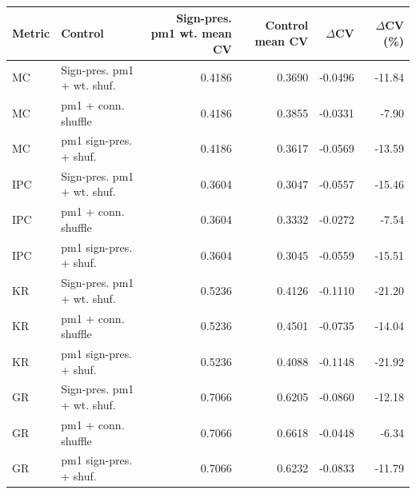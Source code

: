 \begin{tabular}{llrrrr}
\toprule
Metric & Control & Sign-pres. pm1 wt. mean CV & Control mean CV & $\Delta$CV & $\Delta$CV (\%) \\
\midrule
MC & Sign-pres. pm1 + wt. shuf. & 0.4186 & 0.3690 & -0.0496 & -11.84 \\
MC & pm1 + conn. shuffle & 0.4186 & 0.3855 & -0.0331 & -7.90 \\
MC & pm1 sign-pres. + shuf. & 0.4186 & 0.3617 & -0.0569 & -13.59 \\
IPC & Sign-pres. pm1 + wt. shuf. & 0.3604 & 0.3047 & -0.0557 & -15.46 \\
IPC & pm1 + conn. shuffle & 0.3604 & 0.3332 & -0.0272 & -7.54 \\
IPC & pm1 sign-pres. + shuf. & 0.3604 & 0.3045 & -0.0559 & -15.51 \\
KR & Sign-pres. pm1 + wt. shuf. & 0.5236 & 0.4126 & -0.1110 & -21.20 \\
KR & pm1 + conn. shuffle & 0.5236 & 0.4501 & -0.0735 & -14.04 \\
KR & pm1 sign-pres. + shuf. & 0.5236 & 0.4088 & -0.1148 & -21.92 \\
GR & Sign-pres. pm1 + wt. shuf. & 0.7066 & 0.6205 & -0.0860 & -12.18 \\
GR & pm1 + conn. shuffle & 0.7066 & 0.6618 & -0.0448 & -6.34 \\
GR & pm1 sign-pres. + shuf. & 0.7066 & 0.6232 & -0.0833 & -11.79 \\
\bottomrule
\end{tabular}
